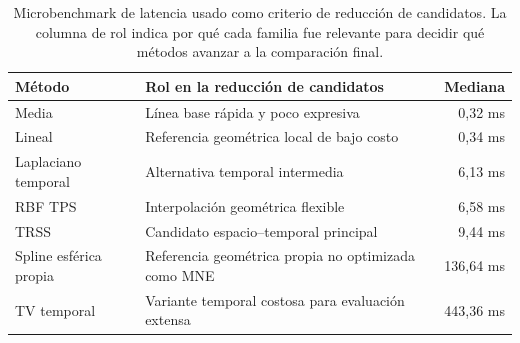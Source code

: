 \begin{table}[htbp]
\centering
\small
\caption{Microbenchmark de latencia usado como criterio de reducción de candidatos. La columna de rol indica por qué cada familia fue relevante para decidir qué métodos avanzar a la comparación final.}
\label{tab:ch4_runtime_selection_summary}
\begin{tabular}{@{}p{3.5cm}p{5.7cm}r@{}}
\toprule
Método & Rol en la reducción de candidatos & Mediana \\
\midrule
Media & Línea base rápida y poco expresiva & 0{,}32 ms \\
Lineal & Referencia geométrica local de bajo costo & 0{,}34 ms \\
Laplaciano temporal & Alternativa temporal intermedia & 6{,}13 ms \\
RBF TPS & Interpolación geométrica flexible & 6{,}58 ms \\
TRSS & Candidato espacio--temporal principal & 9{,}44 ms \\
Spline esférica propia & Referencia geométrica propia no optimizada como MNE & 136{,}64 ms \\
TV temporal & Variante temporal costosa para evaluación extensa & 443{,}36 ms \\
\bottomrule
\end{tabular}
\end{table}
